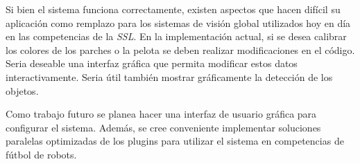 Si bien el sistema funciona correctamente, existen aspectos que hacen difícil su
aplicación como remplazo para los sistemas de visión global utilizados hoy en
día en las competencias de la \emph{SSL}. En la implementación actual, si se
desea calibrar los colores de los parches o la pelota se deben realizar
modificaciones en el código. Seria deseable una interfaz gráfica que permita
modificar estos datos interactivamente. Seria útil también mostrar gráficamente
la detección de los objetos.

Como trabajo futuro se planea hacer una interfaz de usuario gráfica para
configurar el sistema. Además, se cree conveniente implementar soluciones
paralelas optimizadas de los plugins para utilizar el sistema en competencias de
fútbol de robots.

